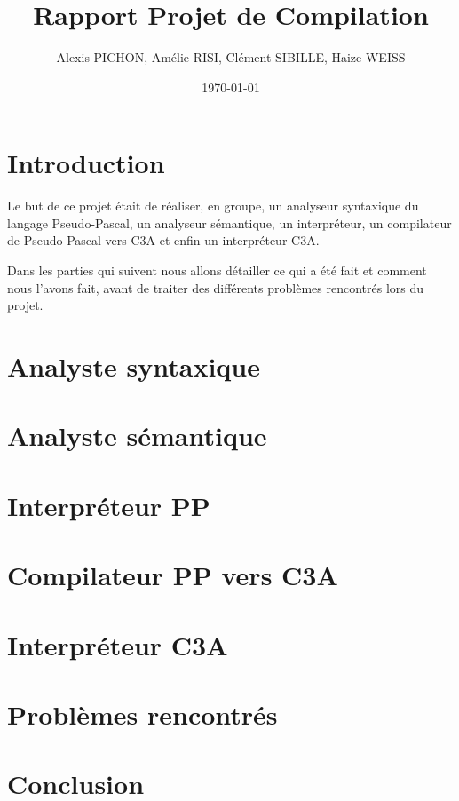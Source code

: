 \documentclass[11pt,a4paper]{article}
\title{Rapport Projet de Compilation}
\author{Alexis PICHON, Amélie RISI, Clément SIBILLE, Haize WEISS}
\date{\today}
\begin{document}
\maketitle
\tableofcontents
\pagebreak

\setlength{\parskip}{1em}
\setlength{\intextsep}{2em}


\section{Introduction}
Le but de ce projet était de réaliser, en groupe, un analyseur syntaxique du langage Pseudo-Pascal, un analyseur sémantique, un interpréteur, un compilateur de Pseudo-Pascal vers C3A et enfin un interpréteur C3A.
\par
Dans les parties qui suivent nous allons détailler ce qui a été fait et comment nous l'avons fait, avant de traiter des différents problèmes rencontrés lors du projet.
\section{Analyste syntaxique}
\section{Analyste sémantique}
\section{Interpréteur PP}
\section{Compilateur PP vers C3A}
\section{Interpréteur C3A}
\section{Problèmes rencontrés}
\section{Conclusion}
\end{document}
